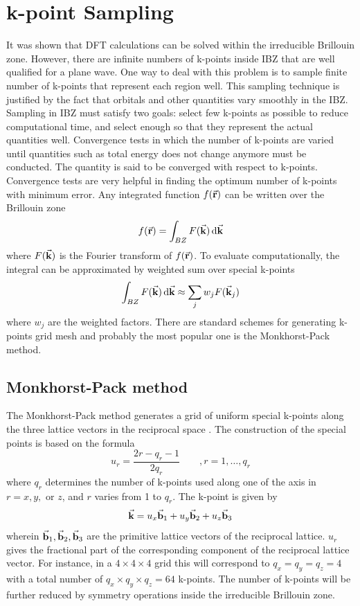 \section{k-point Sampling}
It was shown that DFT calculations can be solved within the irreducible Brillouin zone. However, there are infinite numbers of k-points inside IBZ that are well qualified for a plane wave. One way to deal with this problem is to sample finite number of k-points that represent each region well. This sampling technique is justified by the fact that orbitals and other quantities vary smoothly in the IBZ. Sampling in IBZ must satisfy two goals: select few k-points as possible to reduce computational time, and select enough so that they represent the actual quantities well. Convergence tests  in which the  number of k-points are varied until quantities such as total energy does not change anymore must be conducted. The quantity is said to be converged with respect to k-points.  Convergence tests are very helpful in finding the optimum number of k-points with minimum error. Any integrated function $f(\va{r})$ can be written over the Brillouin zone
\begin{equation}
    f(\va{r}) = \int_{BZ} F(\va{k}) \dd{\va{k}}
\end{equation}
where $F(\va{k})$ is the Fourier transform of $f(\va{r})$. To evaluate computationally, the integral can be approximated by weighted sum over special k-points
\begin{equation}\label{eq:BZ_approx}
    \int_{BZ} F(\va{k}) \dd{\va{k}} \approx \sum_{j} w_{j}  F(\va{k}_j)
\end{equation}
where $w_{j}$ are the weighted factors. 
There are standard schemes for generating k-points grid mesh and probably the most popular one is the Monkhorst-Pack method.  

\subsection{Monkhorst-Pack method}
The Monkhorst-Pack method generates a grid of uniform special k-points along the three lattice vectors in the reciprocal space \citep{Monkhorst1976}. The construction of the special points is based on the formula
\begin{equation}
    u_{r} = \frac{2r - q_r -1}{2 q_r} \qquad , r = 1, \dots, q_r
\end{equation}
where $q_r$ determines the number of k-points  used along one of the axis in $r = x, y, {\text{ or }} z$, and  $r$ varies from 1 to $q_r$. The k-point is given by
\begin{equation}
    \va{k} = u_x \va{b}_1 + u_y \va{b}_2 + u_z \va{b}_3
\end{equation}
wherein $\va{b}_1, \va{b}_2, \va{b}_3$ are the primitive lattice vectors of the reciprocal lattice. $u_r$ gives the fractional part of the corresponding component of the reciprocal lattice vector. For instance, in a $4 \times 4 \times 4$ grid this will correspond to $q_x = q_y = q_z = 4$ with a total number of $q_x \times q_y \times q_z = 64$ k-points. The number of k-points will be further reduced by symmetry operations inside the irreducible Brillouin zone. 

